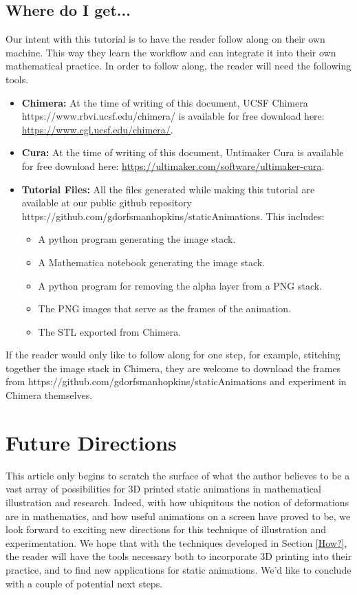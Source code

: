 \documentclass[12 pt]{article}
\begin{document}
\subsection{Where do I get...}\label{where}
Our intent with this tutorial is to have the reader follow along on their own machine.  This way they learn the workflow and can integrate it into their own mathematical practice.  In order to follow along, the reader will need the following tools.
\begin{itemize}
    \item \textbf{Chimera:} At the time of writing of this document, UCSF Chimera https://www.rbvi.ucsf.edu/chimera/ is available for free download here: \url{https://www.cgl.ucsf.edu/chimera/}.
    \item \textbf{Cura:} At the time of writing of this document, Untimaker Cura \cite{Cura} is available for free download here: \url{https://ultimaker.com/software/ultimaker-cura}.
    \item \textbf{Tutorial Files:} All the files generated while making this tutorial are available at our public github repository https://github.com/gdorfsmanhopkins/staticAnimations.  This includes:
    \begin{itemize}
        \item A python program generating the image stack.
        \item A Mathematica notebook generating the image stack.
        \item A python program for removing the alpha layer from a PNG stack.
        \item The PNG images that serve as the frames of the animation.
        \item The STL exported from Chimera.
    \end{itemize}
 \end{itemize}
    If the reader would only like to follow along for one step, for example, stitching together the image stack in Chimera, they are welcome to download the frames from https://github.com/gdorfsmanhopkins/staticAnimations and experiment in Chimera themselves.
\section{Future Directions}\label{conclusion}
This article only begins to scratch the surface of what the author believes to be a vast array of possibilities for 3D printed static animations in mathematical illustration and research. Indeed, with how ubiquitous the notion of deformations are in mathematics, and how useful animations on a screen have proved to be, we look forward to exciting new directions for this technique of illustration and experimentation.  We hope that with the techniques developed in Section \ref{How?}, the reader will have the tools necessary both to incorporate 3D printing into their practice, and to find new applications for static animations.  We'd like to conclude with a couple of potential next steps.
\end{document}
